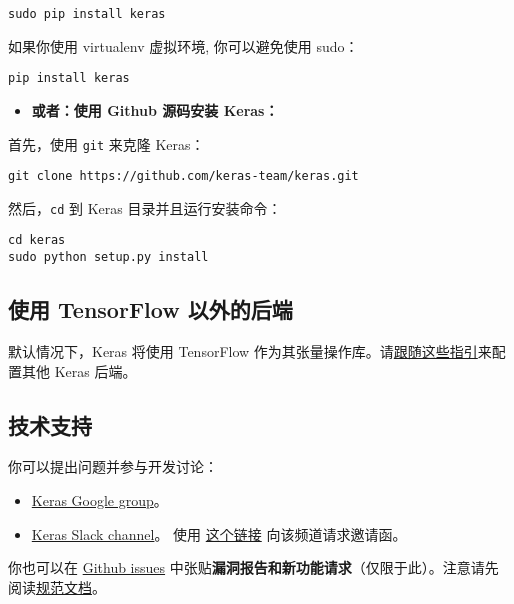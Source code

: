 \begin{verbatim}
sudo pip install keras
\end{verbatim}

如果你使用 virtualenv 虚拟环境, 你可以避免使用 sudo：

\begin{verbatim}
pip install keras
\end{verbatim}

\begin{itemize}
\tightlist
\item
  \textbf{或者：使用 Github 源码安装 Keras：}
\end{itemize}

首先，使用 \texttt{git} 来克隆 Keras：

\begin{verbatim}
git clone https://github.com/keras-team/keras.git
\end{verbatim}

然后，\texttt{cd} 到 Keras 目录并且运行安装命令：

\begin{verbatim}
cd keras
sudo python setup.py install
\end{verbatim}



\subsection{使用 TensorFlow
以外的后端}

默认情况下，Keras 将使用 TensorFlow
作为其张量操作库。请\hyperref[keras-backend]{跟随这些指引}来配置其他
Keras 后端。



\subsection{技术支持}

你可以提出问题并参与开发讨论：

\begin{itemize}
\tightlist
\item
  \href{https://groups.google.com/forum/\#!forum/keras-users}{Keras
  Google group}。
\item
  \href{https://kerasteam.slack.com}{Keras Slack channel}。 使用
  \href{https://keras-slack-autojoin.herokuapp.com/}{这个链接}
  向该频道请求邀请函。
\end{itemize}

你也可以在 \href{https://github.com/keras-team/keras/issues}{Github
issues} 中张贴\textbf{漏洞报告和新功能请求}（仅限于此）。注意请先阅读\hyperref[contributing]{规范文档}。



